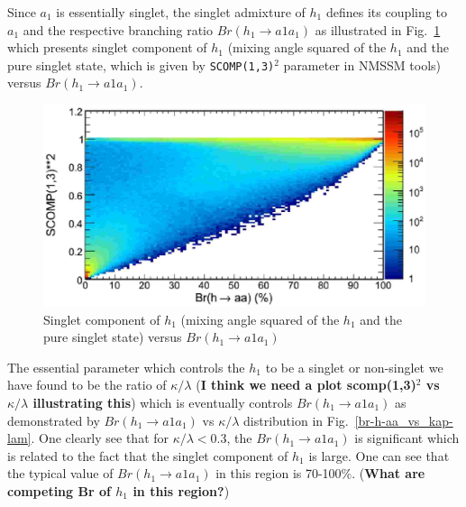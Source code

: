 \documentclass[aps,12pt,superscriptaddress,nofootinbib,floatfix,showpacs]{revtex4}
\begin{document}
Since $a_1$ is essentially singlet, the singlet admixture
of $h_1$ defines its coupling to $a_1$
and the respective branching ratio $Br(h_1\to a1 a_1)$
as illustrated in Fig.~\ref{scomp13-vs-br-h-aa}
which presents singlet component of $h_1$
(mixing angle squared of the $h_1$ and the pure singlet state,
which is given by \verb|SCOMP(1,3)|$^2$ parameter in NMSSM tools)
versus $Br(h_1\to a1 a_1)$. 

\begin{figure}[htb]
\begin{center}
\includegraphics[width=0.75\linewidth]{plots/scomp13_vs_br_h-aa.eps}
\caption{Singlet component of $h_1$
(mixing angle squared of the $h_1$ and the pure singlet state)
versus $Br(h_1\to a1 a_1)$
\label{scomp13-vs-br-h-aa}}
\end{center}
\end{figure}


The essential parameter which controls  the $h_1$ to be a
singlet or non-singlet we have found to be the ratio of
$\kappa/\lambda$  
({\bf I think we need a plot scomp(1,3)$^2$
vs $\kappa/\lambda$  illustrating this}) 
which is eventually
controls  $Br(h_1\to a1 a_1)$ as demonstrated by $Br(h_1\to a1
a_1)$ vs  $\kappa/\lambda$ distribution in
Fig.~\ref{br-h-aa_vs_kap-lam}. One clearly see that for 
$\kappa/\lambda<0.3$, the $Br(h_1\to a1 a_1)$ is significant
which is related to the fact that the singlet component of
$h_1$ is large. One can see that the typical value of  
$Br(h_1\to a1 a_1)$ in this region is 70-100\%. 
({\bf What are
competing Br of $h_1$ in this region?})
\end{document}
